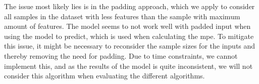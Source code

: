 The issue most likely lies is in the padding approach, which we apply to consider all samples in the dataset with less features than the sample with maximum amount of features. The model seems to not work well with padded input when using the model to predict, which is used when calculating the \gls{mpe}. To mitigate this issue, it might be necessary to reconsider the sample sizes for the inputs and thereby removing the need for padding. Due to time constraints, we cannot implement this, and as the results of the model is quite inconsistent, we will not consider this algorithm when evaluating the different algorithms.

